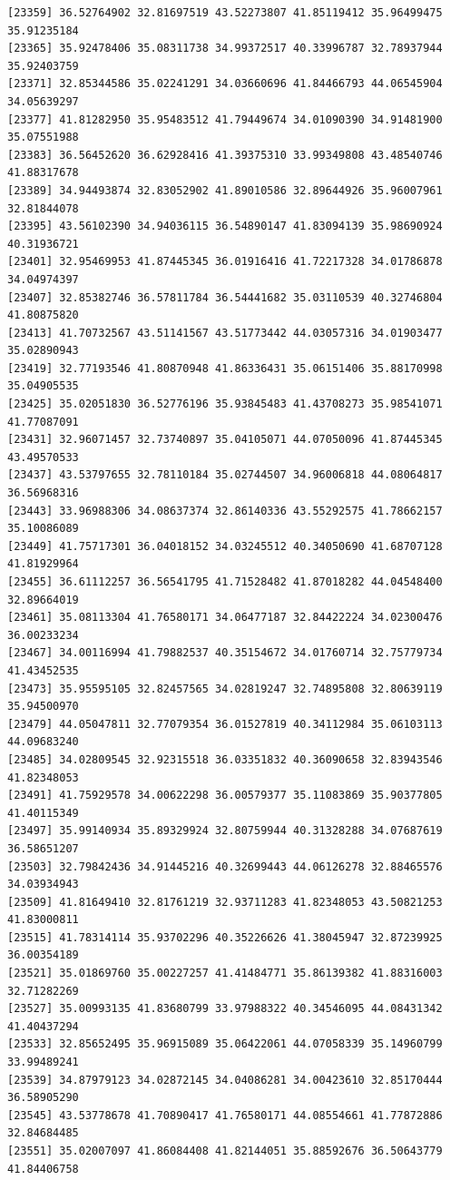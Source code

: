 \documentclass[
  letterpaper,
  DIV=11,
  numbers=noendperiod]{scrartcl}
\begin{document}
\begin{verbatim}
[23359] 36.52764902 32.81697519 43.52273807 41.85119412 35.96499475 35.91235184
[23365] 35.92478406 35.08311738 34.99372517 40.33996787 32.78937944 35.92403759
[23371] 32.85344586 35.02241291 34.03660696 41.84466793 44.06545904 34.05639297
[23377] 41.81282950 35.95483512 41.79449674 34.01090390 34.91481900 35.07551988
[23383] 36.56452620 36.62928416 41.39375310 33.99349808 43.48540746 41.88317678
[23389] 34.94493874 32.83052902 41.89010586 32.89644926 35.96007961 32.81844078
[23395] 43.56102390 34.94036115 36.54890147 41.83094139 35.98690924 40.31936721
[23401] 32.95469953 41.87445345 36.01916416 41.72217328 34.01786878 34.04974397
[23407] 32.85382746 36.57811784 36.54441682 35.03110539 40.32746804 41.80875820
[23413] 41.70732567 43.51141567 43.51773442 44.03057316 34.01903477 35.02890943
[23419] 32.77193546 41.80870948 41.86336431 35.06151406 35.88170998 35.04905535
[23425] 35.02051830 36.52776196 35.93845483 41.43708273 35.98541071 41.77087091
[23431] 32.96071457 32.73740897 35.04105071 44.07050096 41.87445345 43.49570533
[23437] 43.53797655 32.78110184 35.02744507 34.96006818 44.08064817 36.56968316
[23443] 33.96988306 34.08637374 32.86140336 43.55292575 41.78662157 35.10086089
[23449] 41.75717301 36.04018152 34.03245512 40.34050690 41.68707128 41.81929964
[23455] 36.61112257 36.56541795 41.71528482 41.87018282 44.04548400 32.89664019
[23461] 35.08113304 41.76580171 34.06477187 32.84422224 34.02300476 36.00233234
[23467] 34.00116994 41.79882537 40.35154672 34.01760714 32.75779734 41.43452535
[23473] 35.95595105 32.82457565 34.02819247 32.74895808 32.80639119 35.94500970
[23479] 44.05047811 32.77079354 36.01527819 40.34112984 35.06103113 44.09683240
[23485] 34.02809545 32.92315518 36.03351832 40.36090658 32.83943546 41.82348053
[23491] 41.75929578 34.00622298 36.00579377 35.11083869 35.90377805 41.40115349
[23497] 35.99140934 35.89329924 32.80759944 40.31328288 34.07687619 36.58651207
[23503] 32.79842436 34.91445216 40.32699443 44.06126278 32.88465576 34.03934943
[23509] 41.81649410 32.81761219 32.93711283 41.82348053 43.50821253 41.83000811
[23515] 41.78314114 35.93702296 40.35226626 41.38045947 32.87239925 36.00354189
[23521] 35.01869760 35.00227257 41.41484771 35.86139382 41.88316003 32.71282269
[23527] 35.00993135 41.83680799 33.97988322 40.34546095 44.08431342 41.40437294
[23533] 32.85652495 35.96915089 35.06422061 44.07058339 35.14960799 33.99489241
[23539] 34.87979123 34.02872145 34.04086281 34.00423610 32.85170444 36.58905290
[23545] 43.53778678 41.70890417 41.76580171 44.08554661 41.77872886 32.84684485
[23551] 35.02007097 41.86084408 41.82144051 35.88592676 36.50643779 41.84406758

\end{verbatim}
\end{document}
